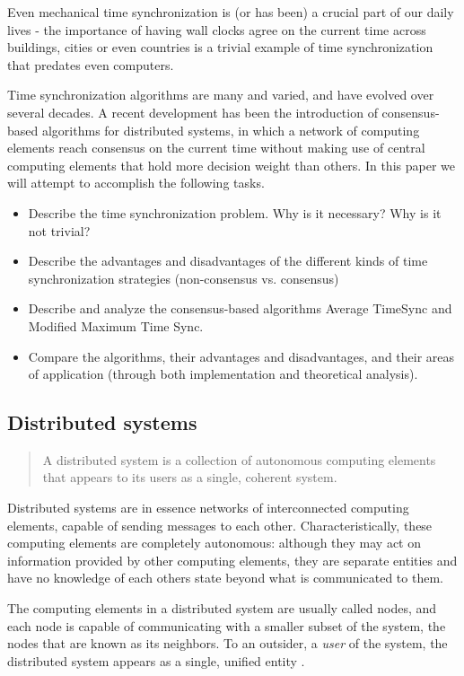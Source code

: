 \documentclass[a4paper,12pt]{article}
\begin{document}
Even mechanical time synchronization is (or has been) a crucial part of our daily lives - the importance of having wall clocks agree on the current time across buildings, cities or even countries is a trivial example of time synchronization that predates even computers.

Time synchronization algorithms are many and varied, and have evolved over several decades. A recent development has been the introduction of consensus-based algorithms for distributed systems, in which a network of computing elements reach consensus on the current time without making use of central computing elements that hold more decision weight than others. In this paper we will attempt to accomplish the following tasks.

\begin{itemize}
    \item Describe the time synchronization problem. Why is it necessary? Why is it not trivial? 
    \item Describe the advantages and disadvantages of the different kinds of time synchronization strategies (non-consensus vs. consensus)
    \item Describe and analyze the consensus-based algorithms Average TimeSync and Modified Maximum Time Sync.
    \item Compare the algorithms, their advantages and disadvantages, and their areas of application (through both implementation and theoretical analysis).
\end{itemize}

\subsection{Distributed systems}

\begin{quote}
  A distributed system is a collection of autonomous computing
  elements that appears to its users as a single, coherent
  system.\cite{TanenbaumSteen06}
\end{quote}

Distributed systems are in essence networks of interconnected computing elements, capable of sending messages to each other. Characteristically, these computing elements are completely autonomous: although they may act on information provided by other computing elements, they are separate entities and have no knowledge of each others state beyond what is communicated to them.

The computing elements in a distributed system are usually called nodes, and each node is capable of communicating with a smaller subset of the system, the nodes that are known as its neighbors. To an outsider, a \textit{user} of the system, the distributed system appears as a single, unified entity \citep{TanenbaumSteen06}.
\end{document}

